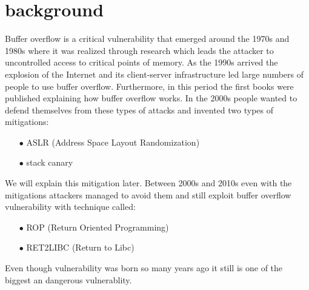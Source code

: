\documentclass{report}
\begin{document}
    \section{background} %
    Buffer overflow is a critical vulnerability that emerged around the 1970s and 1980s where it was 
    realized through research which leads the attacker to uncontrolled access to critical points of memory.\newline
    As the 1990s arrived the explosion of the Internet and its client-server infrastructure led large numbers of people to use buffer overflow.\newline
    Furthermore, in this period the first books were published explaining how buffer overflow works.\newline
    In the 2000s people wanted to defend themselves from these types of attacks and invented two types of mitigations:\newline
    \begin{itemize}
        \item[$\bullet$] ASLR (Address Space Layout Randomization)
        \item[$\bullet$] stack canary 
    \end{itemize}
    We will explain this mitigation later.\newline
    Between 2000s and 2010s even with the mitigations attackers managed to avoid them and still exploit buffer overflow vulnerability with technique called:\newline
        \begin{itemize}
        \item[$\bullet$] ROP (Return Oriented Programming)
        \item[$\bullet$] RET2LIBC (Return to Libc)
    \end{itemize}
    Even though vulnerability was born so many years ago it still is one of the biggest an dangerous vulnerablity.
    \clearpage
\end{document}
